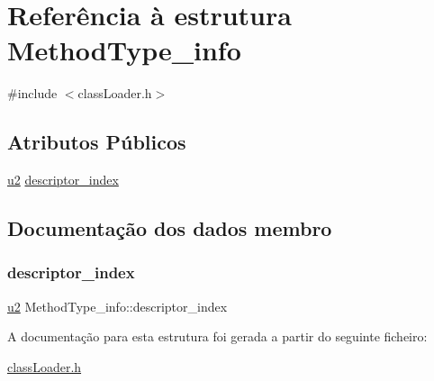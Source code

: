 \hypertarget{struct_method_type__info}{}\section{Referência à estrutura Method\+Type\+\_\+info}
\label{struct_method_type__info}


{\ttfamily \#include $<$class\+Loader.\+h$>$}

\subsection*{Atributos Públicos}
\begin{DoxyCompactItemize}
\item 
\hyperlink{util_8h_a55ef8d87fd202b8417704c089899c5b9}{u2} \hyperlink{struct_method_type__info_a2a69b0e7ffdbff990123a261643896f9}{descriptor\+\_\+index}
\end{DoxyCompactItemize}


\subsection{Documentação dos dados membro}
\mbox{\label{struct_method_type__info_a2a69b0e7ffdbff990123a261643896f9}} 
\subsubsection{\texorpdfstring{descriptor\+\_\+index}{descriptor\_index}}
{\footnotesize\ttfamily \hyperlink{util_8h_a55ef8d87fd202b8417704c089899c5b9}{u2} Method\+Type\+\_\+info\+::descriptor\+\_\+index}



A documentação para esta estrutura foi gerada a partir do seguinte ficheiro\+:\begin{DoxyCompactItemize}
\item 
\hyperlink{class_loader_8h}{class\+Loader.\+h}\end{DoxyCompactItemize}
